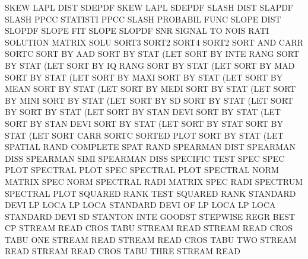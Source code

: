 SKEW     LAPL DIST                      SDEPDF
SKEW     LAPL                           SDEPDF
SLASH    DIST                           SLAPDF
SLASH    PPCC                           STATISTI PPCC
SLASH                                   PROBABIL FUNC
SLOPE    DIST                           SLOPDF
SLOPE                                   FIT
SLOPE                                   SLOPDF
SNR                                     SIGNAL   TO   NOIS RATI
SOLUTION                                MATRIX   SOLU
SORT3                                   SORT2
SORT4                                   SORT2
SORT     AND  CARR                      SORTC
SORT     BY   AAD                       SORT     BY   STAT (LET
SORT     BY   INTE RANG                 SORT     BY   STAT (LET
SORT     BY   IQ   RANG                 SORT     BY   STAT (LET
SORT     BY   MAD                       SORT     BY   STAT (LET
SORT     BY   MAXI                      SORT     BY   STAT (LET
SORT     BY   MEAN                      SORT     BY   STAT (LET
SORT     BY   MEDI                      SORT     BY   STAT (LET
SORT     BY   MINI                      SORT     BY   STAT (LET
SORT     BY   SD                        SORT     BY   STAT (LET
SORT     BY                             SORT     BY   STAT (LET
SORT     BY   STAN DEVI                 SORT     BY   STAT (LET
SORT     BY   STAN DEVI                 SORT     BY   STAT (LET
SORT     BY   STAT                      SORT     BY   STAT (LET
SORT     CARR                           SORTC
SORTED   PLOT                           SORT     BY   STAT (LET
SPATIAL  RAND                           COMPLETE SPAT RAND
SPEARMAN DIST                           SPEARMAN DISS
SPEARMAN SIMI                           SPEARMAN DISS
SPECIFIC                                TEST     SPEC
SPEC     PLOT                           SPECTRAL PLOT
SPEC                                    SPECTRAL PLOT
SPECTRAL NORM                           MATRIX   SPEC NORM
SPECTRAL RADI                           MATRIX   SPEC RADI
SPECTRUM                                SPECTRAL PLOT
SQUARED  RANK TEST                      SQUARED  RANK
STANDARD DEVI LP   LOCA                 LP       LOCA
STANDARD DEVI OF   LP   LOCA            LP       LOCA
STANDARD DEVI                           SD
STANTON  INTE                           GOODST
STEPWISE REGR                           BEST     CP
STREAM   READ CROS TABU                 STREAM   READ
STREAM   READ CROS TABU ONE             STREAM   READ
STREAM   READ CROS TABU TWO             STREAM   READ
STREAM   READ CROS TABU THRE            STREAM   READ
